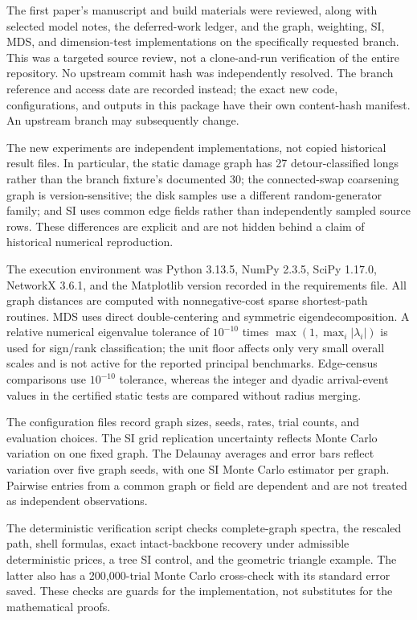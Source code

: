 \documentclass[11pt,letterpaper]{article}
\theoremstyle{definition}
\theoremstyle{remark}
\begin{document}
The first paper's manuscript and build materials were reviewed, along with selected model notes, the deferred-work ledger, and the graph, weighting, SI, MDS, and dimension-test implementations on the specifically requested branch. This was a targeted source review, not a clone-and-run verification of the entire repository. No upstream commit hash was independently resolved. The branch reference and access date are recorded instead; the exact new code, configurations, and outputs in this package have their own content-hash manifest. An upstream branch may subsequently change.

The new experiments are independent implementations, not copied historical result files. In particular, the static damage graph has 27 detour-classified longs rather than the branch fixture's documented 30; the connected-swap coarsening graph is version-sensitive; the disk samples use a different random-generator family; and SI uses common edge fields rather than independently sampled source rows. These differences are explicit and are not hidden behind a claim of historical numerical reproduction.

The execution environment was Python 3.13.5, NumPy 2.3.5, SciPy 1.17.0, NetworkX 3.6.1, and the Matplotlib version recorded in the requirements file. All graph distances are computed with nonnegative-cost sparse shortest-path routines. MDS uses direct double-centering and symmetric eigendecomposition. A relative numerical eigenvalue tolerance of $10^{-10}$ times $\max(1,\max_i|\lambda_i|)$ is used for sign/rank classification; the unit floor affects only very small overall scales and is not active for the reported principal benchmarks. Edge-census comparisons use $10^{-10}$ tolerance, whereas the integer and dyadic arrival-event values in the certified static tests are compared without radius merging.

The configuration files record graph sizes, seeds, rates, trial counts, and evaluation choices. The SI grid replication uncertainty reflects Monte Carlo variation on one fixed graph. The Delaunay averages and error bars reflect variation over five graph seeds, with one SI Monte Carlo estimator per graph. Pairwise entries from a common graph or field are dependent and are not treated as independent observations.

The deterministic verification script checks complete-graph spectra, the rescaled path, shell formulas, exact intact-backbone recovery under admissible deterministic prices, a tree SI control, and the geometric triangle example. The latter also has a 200,000-trial Monte Carlo cross-check with its standard error saved. These checks are guards for the implementation, not substitutes for the mathematical proofs.
\end{document}
